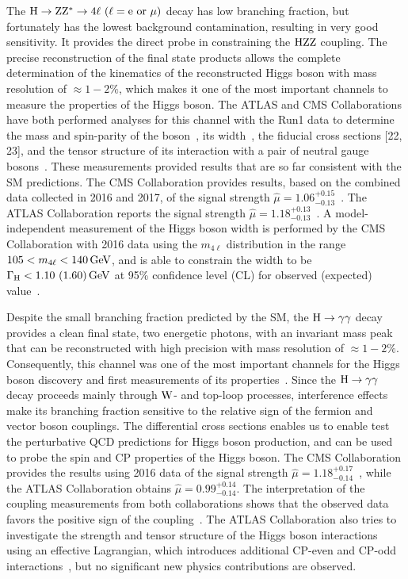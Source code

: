 The $\PH\to\cPZ\cPZ^{*}\to 4\ell\ (\ell=\re\ \text{or}\ \mu)$ decay has low branching fraction, but fortunately has the lowest background contamination, resulting in very good sensitivity. It provides the direct probe in constraining the $\mathrm{H}\mathrm{Z}\mathrm{Z}$ coupling. The precise reconstruction of the final state products allows the complete determination of the kinematics of the reconstructed Higgs boson with mass resolution of $\approx 1 - 2\%$, which makes it one of the most important channels to measure the properties of the Higgs boson. The ATLAS and CMS Collaborations have both performed analyses for this channel with the Run1 data to determine the mass and spin-parity of the boson~\cite{Chatrchyan:2013mxa,Chatrchyan:2012jja,Khachatryan:2014kca,Aad:2014eva,Aad:2015mxa}, its width~\cite{Khachatryan:2014iha,Khachatryan:2015mma,Aad:2015xua}, the fiducial cross sections [22, 23], and the tensor structure of its interaction with a pair of neutral gauge bosons~\cite{Khachatryan:2014kca,Aad:2015mxa,Khachatryan:2015mma}. These measurements provided results that are so far consistent with the SM predictions. The CMS Collaboration provides results, based on the combined data collected in 2016 and 2017, of the signal strength $\hat{\mu}=1.06^{+0.15}_{-0.13}$~\cite{CMS-PAS-HIG-18-001}. The ATLAS Collaboration reports the signal strength $\hat{\mu}=1.18^{+0.13}_{-0.13}$~\cite{ATLAS-CONF-2018-018}. A model-independent measurement of the Higgs boson width is performed by the CMS Collaboration with 2016 data using the $m_{4\ell}$ distribution in the range $105 < m_{4\ell} < 140\,\text{Ge\hspace{-.08em}V}$, and is able to constrain the width to be $\Gamma_{\mathrm{H}}<1.10\ (1.60)\,\text{Ge\hspace{-.08em}V}$ at 95\% confidence level (CL) for observed (expected) value~\cite{Sirunyan:2017exp}.

Despite the small branching fraction predicted by the SM, the $\mathrm{H}\to\gamma\gamma$ decay provides a clean final state, two energetic photons, with an invariant mass peak that can be reconstructed with high precision with mass resolution of $\approx 1 - 2\%$. Consequently, this channel was one of the most important channels for the Higgs boson discovery and first measurements of its properties~\cite{Khachatryan:2014ira,Aad:2014eha}. Since the $\mathrm{H}\to\gamma\gamma$ decay proceeds mainly through $\mathrm{W}$- and top-loop processes, interference effects make its branching fraction sensitive to the relative sign of the fermion and vector boson couplings. The differential cross sections enables us to enable test the perturbative QCD predictions for Higgs boson production, and can be used to probe the spin and CP properties of the Higgs boson. The CMS Collaboration provides the results using 2016 data of the signal strength $\hat{\mu}=1.18^{+0.17}_{-0.14}$~\cite{Sirunyan:2018ouh}, while the ATLAS Collaboration obtains $\hat{\mu}=0.99^{+0.14}_{-0.14}$. The interpretation of the coupling measurements from both collaborations shows that the observed data favors the positive sign of the coupling~\cite{Sirunyan:2018kta,Aaboud:2018xdt}. The ATLAS Collaboration also tries to investigate the strength and tensor structure of the Higgs boson interactions using an effective Lagrangian, which introduces additional CP-even and CP-odd interactions~\cite{Aaboud:2018xdt}, but no significant new physics contributions are observed.

